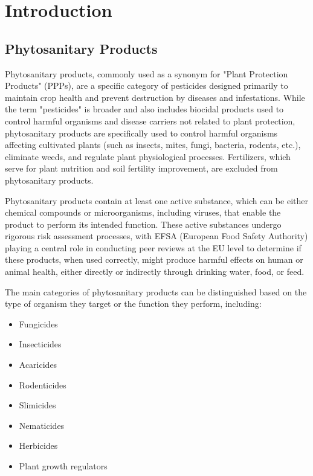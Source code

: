 \documentclass[12pt,a4paper,oneside]{report}
\begin{document}


\tableofcontents
\newpage

\chapter{Introduction}

\section{Phytosanitary Products}

Phytosanitary products, commonly used as a synonym for "Plant Protection Products" (PPPs),
are a specific category of pesticides designed primarily to maintain crop health 
and prevent destruction by diseases and infestations. While the term "pesticides" 
is broader and also includes biocidal products used to control harmful organisms 
and disease carriers not related to plant protection, phytosanitary products are 
specifically used to control harmful organisms affecting cultivated plants (such 
as insects, mites, fungi, bacteria, rodents, etc.), eliminate weeds, and regulate 
plant physiological processes. Fertilizers, which serve for plant nutrition and 
soil fertility improvement, are excluded from phytosanitary products.

Phytosanitary products contain at least one active substance, which can be either 
chemical compounds or microorganisms, including viruses, that enable the product 
to perform its intended function. These active substances undergo rigorous risk 
assessment processes, with EFSA (European Food Safety Authority) playing a central 
role in conducting peer reviews at the EU level to determine if these products, 
when used correctly, might produce harmful effects on human or animal health, either 
directly or indirectly through drinking water, food, or feed.

The main categories of phytosanitary products can be distinguished based on the 
type of organism they target or the function they perform, including:


\begin{itemize}
    \item Fungicides
    \item Insecticides
    \item Acaricides
    \item Rodenticides
    \item Slimicides
    \item Nematicides
    \item Herbicides
    \item Plant growth regulators
\end{itemize}
\end{document}
